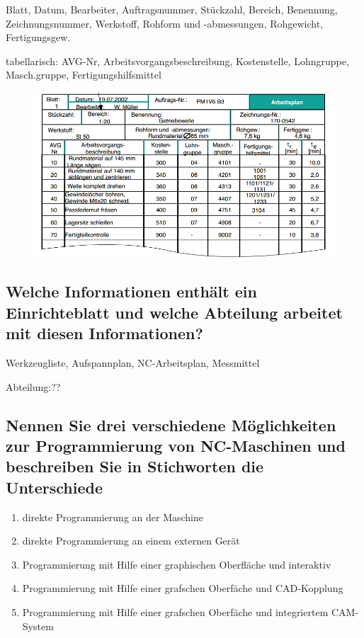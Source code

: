 Blatt, Datum, Bearbeiter, Auftragsnummer, Stückzahl, Bereich, Benennung,
Zeichnungsnummer, Werkstoff, Rohform und -abmessungen, Rohgewicht,
Fertigungsgew.

tabellarisch: AVG-Nr, Arbeitsvorgangsbeschreibung, Kostenstelle, Lohngruppe,
Masch.gruppe, Fertigungshilfsmittel

\begin{figure}[h]
    \centering
    \includegraphics[scale=0.7]{Bild2_3.png}
\end{figure}

\subsection*{%
    Welche Informationen enthält ein Einrichteblatt und welche Abteilung
    arbeitet mit diesen Informationen?
}

Werkzeugliste, Aufspannplan, NC-Arbeitsplan, Messmittel

Abteilung:??

\subsection*{%
    Nennen Sie drei verschiedene Möglichkeiten zur Programmierung von
    NC-Maschinen und beschreiben Sie in Stichworten die Unterschiede
}

\begin{enumerate}[1)]
    \item direkte Programmierung an der Maschine
    \item direkte Programmierung an einem externen Gerät
    \item Programmierung mit Hilfe einer graphischen Oberfläche und interaktiv
    \item Programmierung mit Hilfe einer grafschen Oberfäche und CAD-Kopplung
    \item
        Programmierung mit Hilfe einer grafschen Oberfäche und integriertem
        CAM-System
\end{enumerate}

